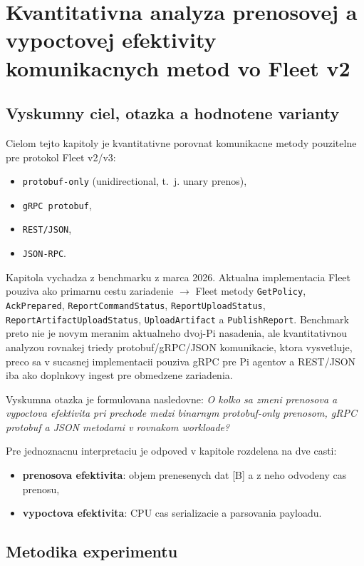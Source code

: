 \documentclass[12pt,a4paper]{report}
\begin{document}
\chapter{Kvantitativna analyza prenosovej a vypoctovej efektivity komunikacnych metod vo Fleet v2}
\label{chap:analyza-protokolov-fleet-v2}

\section{Vyskumny ciel, otazka a hodnotene varianty}

Cielom tejto kapitoly je kvantitativne porovnat komunikacne metody
pouzitelne pre protokol Fleet v2/v3:
\begin{itemize}
  \item \texttt{protobuf-only} (unidirectional, t.~j. unary prenos),
  \item \texttt{gRPC protobuf},
  \item \texttt{REST/JSON},
  \item \texttt{JSON-RPC}.
\end{itemize}

Kapitola vychadza z benchmarku z marca 2026. Aktualna implementacia Fleet
pouziva ako primarnu cestu zariadenie $\rightarrow$ Fleet metody
\texttt{GetPolicy}, \texttt{AckPrepared}, \texttt{ReportCommandStatus},
\texttt{ReportUploadStatus}, \texttt{ReportArtifactUploadStatus},
\texttt{UploadArtifact} a \texttt{PublishReport}. Benchmark preto nie je
novym meranim aktualneho dvoj-Pi nasadenia, ale kvantitativnou analyzou
rovnakej triedy protobuf/gRPC/JSON komunikacie, ktora vysvetluje, preco sa
v sucasnej implementacii pouziva gRPC pre Pi agentov a REST/JSON iba ako
doplnkovy ingest pre obmedzene zariadenia.

Vyskumna otazka je formulovana nasledovne:
\textit{O kolko sa zmeni prenosova a vypoctova efektivita pri prechode
medzi binarnym protobuf-only prenosom, gRPC protobuf a JSON metodami
v rovnakom workloade?}

Pre jednoznacnu interpretaciu je odpoved v kapitole rozdelena na dve casti:
\begin{itemize}
  \item \textbf{prenosova efektivita}: objem prenesenych dat [B] a z neho odvodeny cas prenosu,
  \item \textbf{vypoctova efektivita}: CPU cas serializacie a parsovania payloadu.
\end{itemize}

\section{Metodika experimentu}
\end{document}
